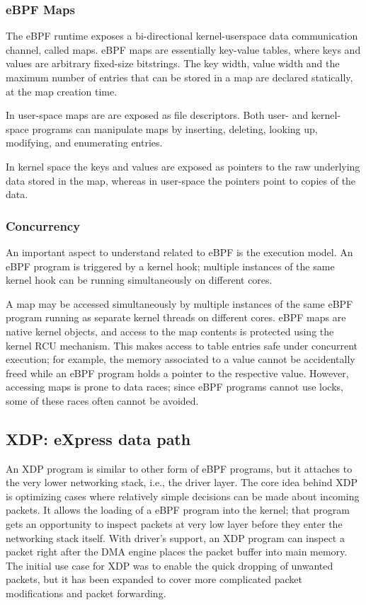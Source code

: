\subsubsection{eBPF Maps}

The eBPF runtime exposes a bi-directional kernel-userspace data
communication channel, called maps.  eBPF maps are essentially
key-value tables, where keys and values are arbitrary fixed-size
bitstrings. The key width, value width and the maximum number of
entries that can be stored in a map are declared statically, at the
map creation time.

In user-space maps are are exposed as file descriptors. Both user- and
kernel-space programs can manipulate maps by inserting, deleting,
looking up, modifying, and enumerating entries.

In kernel space the keys and values are exposed as pointers to the raw
underlying data stored in the map, whereas in user-space the
pointers point to copies of the data.

\subsubsection{Concurrency}

An important aspect to understand related to eBPF is the execution
model. An eBPF program is triggered by a kernel hook; multiple
instances of the same kernel hook can be running simultaneously on
different cores.

A map may be accessed simultaneously by multiple instances of the same
eBPF program running as separate kernel threads on different cores.
eBPF maps are native kernel objects, and access to the map contents is
protected using the kernel RCU mechanism. This makes access to table
entries safe under concurrent execution; for example, the memory
associated to a value cannot be accidentally freed while an eBPF
program holds a pointer to the respective value.  However, accessing
maps is prone to data races; since eBPF programs cannot use locks,
some of these races often cannot be avoided.

\subsection{XDP: eXpress data path}
An XDP program is similar to other form of eBPF programs, but it attaches
to the very lower networking stack, i.e., the driver layer.
The core idea behind XDP is optimizing cases where relatively simple
decisions can be made about incoming packets. It allows the loading
of a eBPF program into the kernel; that program gets an opportunity
to inspect packets at very low layer before they enter the networking
stack itself. With driver's support, an XDP program can inspect a packet
right after the DMA engine places the packet buffer into main memory.
The initial use case for XDP was to enable the quick dropping of
unwanted packets, but it has been expanded to cover more complicated
packet modifications and packet forwarding.

